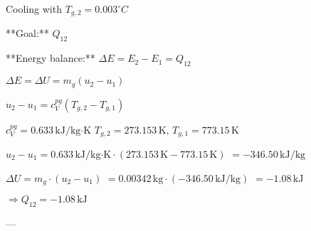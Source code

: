 Cooling with \( T_{g,2} = 0.003^\circ C \)  

**Goal:** \( Q_{12} \)  

**Energy balance:**  
\( \Delta E = E_2 - E_1 = Q_{12} \)  

\( \Delta E = \Delta U = m_g (u_2 - u_1) \)  

\( u_2 - u_1 = c_V^{pg} (T_{g,2} - T_{g,1}) \)  

\( c_V^{pg} = 0.633 \, \text{kJ/kg·K} \)  
\( T_{g,2} = 273.153 \, \text{K}, \, T_{g,1} = 773.15 \, \text{K} \)  

\( u_2 - u_1 = 0.633 \, \text{kJ/kg·K} \cdot (273.153 \, \text{K} - 773.15 \, \text{K}) \)  
\( = -346.50 \, \text{kJ/kg} \)  

\( \Delta U = m_g \cdot (u_2 - u_1) \)  
\( = 0.00342 \, \text{kg} \cdot (-346.50 \, \text{kJ/kg}) \)  
\( = -1.08 \, \text{kJ} \)  

\( \Rightarrow Q_{12} = -1.08 \, \text{kJ} \)  

---